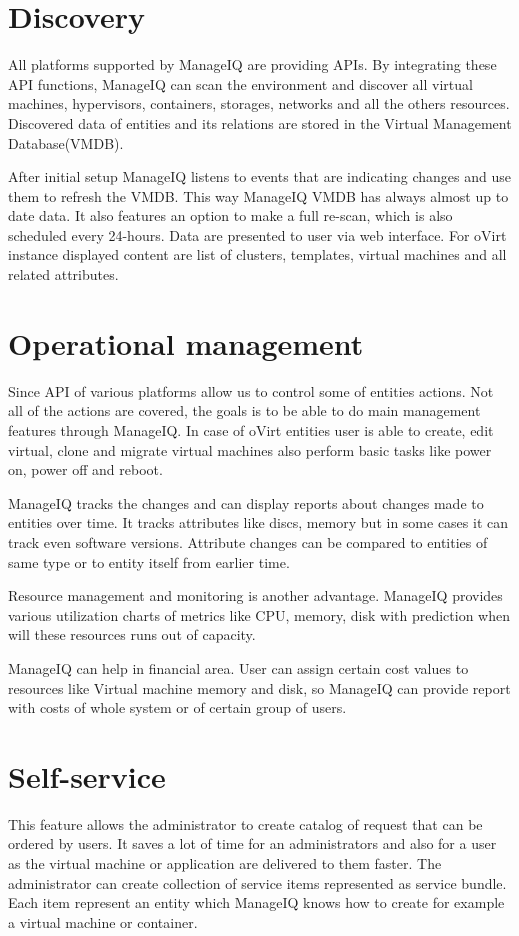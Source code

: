 \section{Discovery}
All platforms supported by ManageIQ are providing APIs. By integrating these API functions, ManageIQ can scan the environment and discover all virtual machines, hypervisors, containers, storages, networks and all the others resources. Discovered data of entities and its relations are stored in the Virtual Management Database(VMDB). 

After initial setup ManageIQ listens to events that are indicating changes and use them to refresh the VMDB. This way ManageIQ VMDB has always almost up to date data. It also features an option to make a full re-scan, which is also scheduled every 24-hours.
Data are presented to user via web interface. For oVirt instance displayed content are list of clusters, templates, virtual machines and all related attributes.

\section{Operational management}
Since API of various platforms allow us to control some of entities actions. Not all of the actions are covered, the goals is to be able to do main management features through ManageIQ. 
In case of oVirt entities user is able to create, edit virtual, clone and migrate virtual machines also perform basic tasks like power on, power off and reboot.

ManageIQ tracks the changes and can display reports about changes made to entities over time. It tracks attributes like discs, memory but in some cases it can track even software versions. Attribute changes can be compared to entities of same type or to entity itself from earlier time.

Resource management and monitoring is another advantage. ManageIQ provides various utilization charts of metrics like CPU, memory, disk with prediction when will these resources runs out of capacity.

ManageIQ can help in financial area. User can assign certain cost values to resources like Virtual machine memory and disk, so ManageIQ can provide report with costs of whole system or of certain group of users.

\section{Self-service}
This feature allows the administrator to create catalog of request that can be ordered by users. It saves a lot of time for an administrators and also for a user as the virtual machine or application are delivered to them faster. The administrator can create collection of service items represented as service bundle. Each item represent an entity which ManageIQ knows how to create for example a virtual machine or container. 

